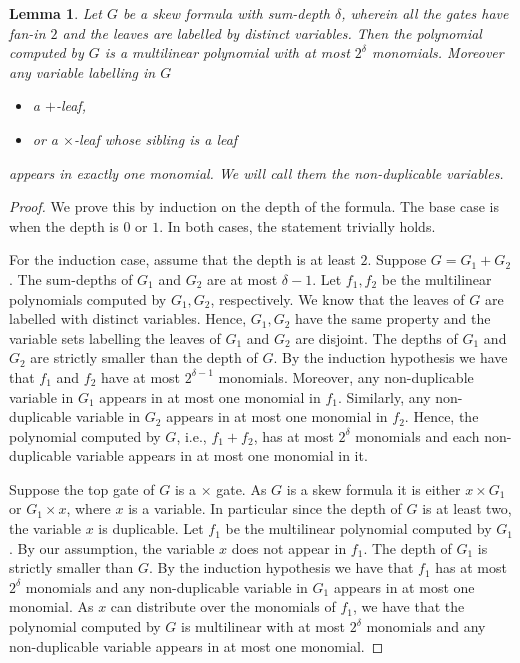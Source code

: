 \documentclass[11pt,a4paper]{article}
\newtheorem{lemma}[theorem]{Lemma}
\begin{document}
\begin{lemma}
	\label{lem:skew}
	Let $G$ be a skew formula with sum-depth $\delta$, wherein all the gates have fan-in $2$ and the leaves are labelled by distinct variables. Then the polynomial computed by $G$ is a multilinear polynomial with at most $2^\delta$ monomials. Moreover any variable labelling in \(G\) 
	\begin{itemize}
		\item a $+$-leaf,
		\item or a \(\times\)-leaf whose sibling is a leaf
	\end{itemize}
	appears in exactly one monomial. We will call them the {\em non-duplicable} variables. 
\end{lemma}
\begin{proof}
	We prove this by induction on the depth of the formula. The base case is when the depth is $0$ or \(1\).
	In both cases, the statement trivially holds. 
	
	For the induction case, assume that the depth is at least \(2\). 
	Suppose $G = G_1 + G_2$. The sum-depths of $G_1$ and $G_2$ are at most $\delta-1$. Let $f_1,f_2$ be the multilinear polynomials computed by $G_1, G_2$, respectively. We know that the leaves of $G$ are labelled with distinct variables. Hence, $G_1, G_2$ have the same property and the variable sets labelling the leaves of $G_1$ and $G_2$ are disjoint. 
	The depths of $G_1$ and $G_2$ are strictly smaller than the depth of $G$. By the induction hypothesis we have that $f_1$ and $f_2$ have at most $2^{\delta-1}$ monomials.  Moreover, any non-duplicable variable in $G_1$ appears in at most one monomial in $f_1$. Similarly, any non-duplicable variable in $G_2$ appears in at most one monomial in $f_2$. Hence, the polynomial computed by $G$, i.e., $f_1+f_2$,  has at most $2^\delta$ monomials and each non-duplicable variable appears in at most one monomial in it. 
	
	Suppose the top gate of $G$ is a $\times$ gate. As $G$ is a skew formula it is either  $x \times G_1$ or $G_1 \times x$, where $x$ is a variable. In particular since the depth of \(G\) is at least two, the variable \(x\) is duplicable. Let $f_1$ be the multilinear polynomial computed by $G_1$. By our assumption, the variable $x$ does not appear in $f_1$. The depth of $G_1$ is strictly smaller than $G$.  By the induction hypothesis we have that $f_1$ has at most $2^\delta$ monomials and any non-duplicable variable in $G_1$ appears in at most one monomial. As $x$ can distribute over the monomials of $f_1$, we have that the polynomial computed by $G$ is multilinear with at most $2^\delta$ monomials and any non-duplicable variable appears in at most one monomial.  
	

\end{proof}
\end{document}
